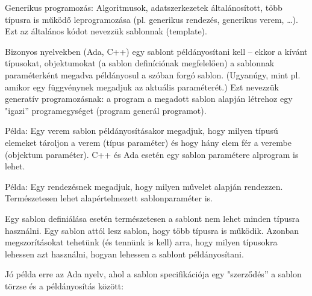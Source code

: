 \documentclass[margin=0px]{article}
\begin{document}
Generikus programozás: Algoritmusok, adatszerkezetek általánosított, több típusra is működő
leprogramozása (pl. generikus rendezés, generikus verem, …). Ezt az általános kódot nevezzük sablonnak
(template).

Bizonyos nyelvekben (Ada, C++) egy sablont példányosítani kell – ekkor a kívánt típusokat, objektumokat
(a sablon definíciónak megfelelően) a sablonnak paraméterként megadva példányosul a szóban forgó sablon.
(Ugyanúgy, mint pl. amikor egy függvénynek megadjuk az aktuális paraméterét.) Ezt nevezzük generatív
programozásnak: a program a megadott sablon alapján létrehoz egy "igazi” programegységet (program
generál programot).

Példa: Egy verem sablon példányosításakor megadjuk, hogy milyen típusú elemeket tároljon a verem (típus
paraméter) és hogy hány elem fér a verembe (objektum paraméter).
C++ és Ada esetén egy sablon paramétere alprogram is lehet.

Példa: Egy rendezésnek megadjuk, hogy milyen művelet alapján rendezzen.
Természetesen lehet alapértelmezett sablonparaméter is.

Egy sablon definiálása esetén természetesen a sablont nem lehet minden típusra használni. Egy sablon attól
lesz sablon, hogy több típusra is működik. Azonban megszorításokat tehetünk (és tennünk is kell) arra, hogy
milyen típusokra lehessen azt használni, hogyan lehessen a sablont példányosítani.

Jó példa erre az Ada nyelv, ahol a sablon specifikációja egy "szerződés” a sablon törzse és a példányosítás
között:
\end{document}
